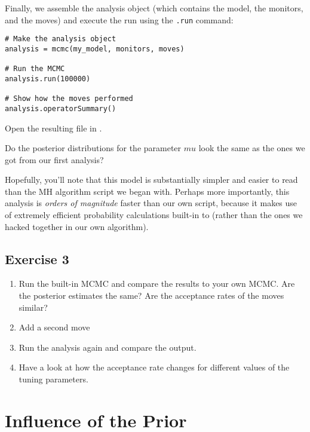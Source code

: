 Finally, we assemble the analysis object (which contains the model, the monitors, and the moves) and execute the run using the \texttt{.run} command:
{\tt \begin{snugshade*}
\begin{lstlisting}    
# Make the analysis object
analysis = mcmc(my_model, monitors, moves)

# Run the MCMC
analysis.run(100000)

# Show how the moves performed
analysis.operatorSummary()
\end{lstlisting}
\end{snugshade*}}
\begin{framed}
Open the resulting  file in \Tracer.

\QUEST Do the posterior distributions for the parameter $mu$ look the same as the ones we got from our first analysis?
\end{framed}


Hopefully, you'll note that this \Rev model is substantially simpler and easier to read than the MH algorithm script we began with.
Perhaps more importantly, this \Rev analysis is \emph{orders of magnitude} faster than our own script, because it makes use of extremely efficient probability calculations built-in to \RevBayes (rather than the ones we hacked together in our own algorithm).

\subsection{Exercise 3}

\begin{enumerate}[label=\textnormal{Step \arabic*)},leftmargin=1.5cm]
	\item Run the built-in MCMC and compare the results to your own MCMC. Are the posterior estimates the same? Are the acceptance rates of the moves similar?
	\item Add a second move 
	\item Run the analysis again and compare the output.
	\item Have a look at how the acceptance rate changes for different values of the tuning parameters.
\end{enumerate}

\section{Influence of the Prior}


